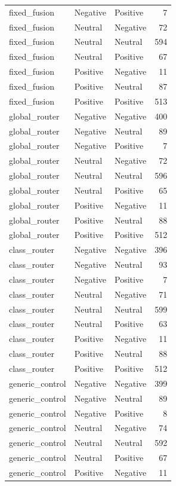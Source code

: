 \begin{tabular}{lllr}
fixed_fusion & Negative & Positive & 7 \\
fixed_fusion & Neutral & Negative & 72 \\
fixed_fusion & Neutral & Neutral & 594 \\
fixed_fusion & Neutral & Positive & 67 \\
fixed_fusion & Positive & Negative & 11 \\
fixed_fusion & Positive & Neutral & 87 \\
fixed_fusion & Positive & Positive & 513 \\
global_router & Negative & Negative & 400 \\
global_router & Negative & Neutral & 89 \\
global_router & Negative & Positive & 7 \\
global_router & Neutral & Negative & 72 \\
global_router & Neutral & Neutral & 596 \\
global_router & Neutral & Positive & 65 \\
global_router & Positive & Negative & 11 \\
global_router & Positive & Neutral & 88 \\
global_router & Positive & Positive & 512 \\
class_router & Negative & Negative & 396 \\
class_router & Negative & Neutral & 93 \\
class_router & Negative & Positive & 7 \\
class_router & Neutral & Negative & 71 \\
class_router & Neutral & Neutral & 599 \\
class_router & Neutral & Positive & 63 \\
class_router & Positive & Negative & 11 \\
class_router & Positive & Neutral & 88 \\
class_router & Positive & Positive & 512 \\
generic_control & Negative & Negative & 399 \\
generic_control & Negative & Neutral & 89 \\
generic_control & Negative & Positive & 8 \\
generic_control & Neutral & Negative & 74 \\
generic_control & Neutral & Neutral & 592 \\
generic_control & Neutral & Positive & 67 \\
generic_control & Positive & Negative & 11 \\

\end{tabular}
